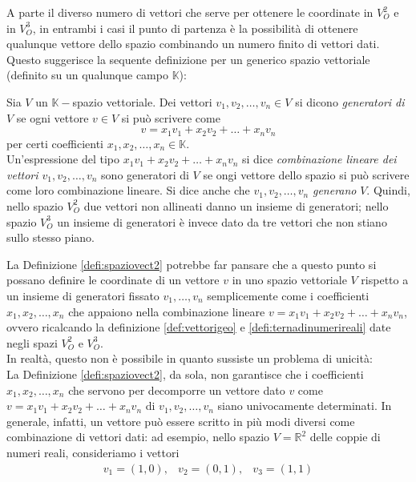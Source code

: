 A parte il diverso numero di vettori che serve per ottenere le coordinate in $V_O^2$ e in $V_O^3$, in entrambi i casi il punto di partenza è la possibilità di ottenere qualunque vettore dello spazio combinando un numero finito di vettori dati.
Questo suggerisce la sequente definizione per un generico spazio vettoriale (definito su un qualunque campo $\mathds{K}$):
\begin{defi}
  \label{defi:spaziovect2}
  Sia $V$ un $\mathds{K}-$spazio vettoriale. Dei vettori $v_1,v_2,\dots,v_n\in V$ si dicono \textit{generatori di $V$} se ogni vettore $v\in V$ si può scrivere come
  \begin{equation*}
    v=x_1v_1+x_2v_2+\dots+x_nv_n
  \end{equation*}
  per certi coefficienti $x_1,x_2,\dots,x_n\in\mathds{K}$.\\
  Un'espressione del tipo $x_1v_1+x_2v_2+\dots+x_nv_n$ si dice \textit{combinazione lineare dei vettori $v_1,v_2,\dots,v_n$} sono generatori di $V$ se ongi vettore dello spazio si può scrivere come loro combinazione lineare. Si dice anche che $v_1,v_2,\dots,v_n$ \textit{generano} $V$. Quindi, nello spazio $V_O^2$ due vettori non allineati danno un insieme di generatori; nello spazio $V_O^3$ un insieme di generatori è invece dato da tre vettori che non stiano sullo stesso piano.
\end{defi}
La Definizione \ref{defi:spaziovect2} potrebbe far pansare che a questo punto si possano definire le coordinate di un vettore $v$ in uno spazio vettoriale $V$ rispetto a un insieme di generatori fissato $v_1,\dots, v_n$ semplicemente come i coefficienti $x_1,x_2,\dots,x_n$ che appaiono nella combinazione lineare $v=x_1v_1+x_2v_2+\dots+x_nv_n$, ovvero ricalcando la definizione \ref{def:vettorigeo} e \ref{defi:ternadinumerireali} date negli spazi $V_O^2$ e $V_O^3$.\\
In realtà, questo non è possibile in quanto sussiste un problema di unicità:\\
La Definizione \ref{defi:spaziovect2}, da sola, non garantisce che i coefficienti $x_1,x_2,\dots, x_n$ che servono per decomporre un vettore dato $v$ come $v=x_1v_1+x_2v_2+\dots +x_nv_n$ di $v_1,v_2,\dots, v_n$ siano univocamente determinati. In generale, infatti, un vettore può essere scritto in più modi diversi come combinazione di vettori dati: ad esempio, nello spazio $V=\mathds{R}^2$ delle coppie di numeri reali, consideriamo i vettori
\begin{eqnarray*}
  v_1=(1,0), & v_2=(0,1), & v_3=(1,1)
\end{eqnarray*}
